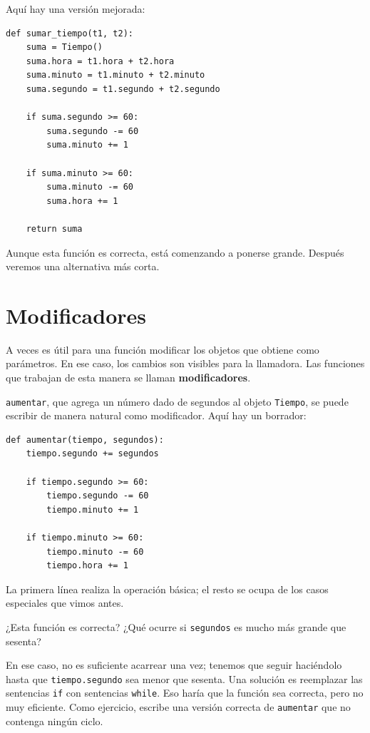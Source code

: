 \documentclass[10pt]{book}
\begin{document}
Aquí hay una versión mejorada:

\begin{verbatim}
def sumar_tiempo(t1, t2):
    suma = Tiempo()
    suma.hora = t1.hora + t2.hora
    suma.minuto = t1.minuto + t2.minuto
    suma.segundo = t1.segundo + t2.segundo

    if suma.segundo >= 60:
        suma.segundo -= 60
        suma.minuto += 1

    if suma.minuto >= 60:
        suma.minuto -= 60
        suma.hora += 1

    return suma
\end{verbatim}
%
Aunque esta función es correcta, está comenzando a ponerse grande.
Después veremos una alternativa más corta.


\section{Modificadores}
\label{increment}

A veces es útil para una función modificar los objetos que obtiene como
parámetros.  En ese caso, los cambios son visibles para la llamadora.
Las funciones que trabajan de esta manera se llaman {\bf modificadores}.

{\tt aumentar}, que agrega un número dado de segundos al objeto {\tt Tiempo},
se puede escribir de manera natural como
modificador.  Aquí hay un borrador:

\begin{verbatim}
def aumentar(tiempo, segundos):
    tiempo.segundo += segundos

    if tiempo.segundo >= 60:
        tiempo.segundo -= 60
        tiempo.minuto += 1

    if tiempo.minuto >= 60:
        tiempo.minuto -= 60
        tiempo.hora += 1
\end{verbatim}
%
La primera línea realiza la operación básica; el resto se ocupa
de los casos especiales que vimos antes.

¿Esta función es correcta?  ¿Qué ocurre si {\tt segundos}
es mucho más grande que sesenta?

En ese caso, no es suficiente acarrear una vez; tenemos que seguir haciéndolo
hasta que {\tt tiempo.segundo} sea menor que sesenta.  Una solución es
reemplazar las sentencias {\tt if} con sentencias {\tt while}.  Eso
haría que la función sea correcta, pero no muy eficiente.  Como
ejercicio, escribe una versión correcta de {\tt aumentar} que no
contenga ningún ciclo.
\end{document}
